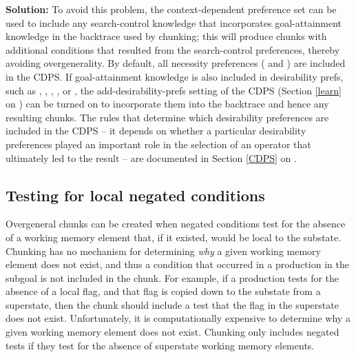 \textbf{Solution:} To avoid this problem, the context-dependent preference set
can be used to include any search-control knowledge that incorporates
goal-attainment knowledge in the backtrace used by chunking;  this will produce
chunks with additional conditions that resulted from the search-control
preferences, thereby avoiding overgenerality.  By default, all necessity
preferences ( and ) are included in the CDPS.  If
goal-attainment knowledge is also included in desirability prefs, such as
, , , , or ,
the add-desirability-prefs setting of the CDPS (Section \ref{learn} on \pageref{learn}) 
can be turned on to incorporate them into the backtrace and hence
any resulting chunks.   The rules that determine which desirability preferences
are included in the CDPS -- it depends on whether a particular desirability
preferences played an important role in the selection of an
operator that ultimately led to the result -- are documented in Section \ref{CDPS} on \pageref{CDPS}.

\subsection{Testing for local negated conditions}

Overgeneral chunks can be created when negated conditions test for the absence
of a working memory element that, if it existed, would be local to the
substate.  Chunking has no mechanism for determining \textit{why} a given
working memory element does not exist, and thus a condition that occurred in a
production in the subgoal is not included in the chunk. For example, if a
production tests for the absence of a local flag, and that flag is copied down
to the substate from a superstate, then the chunk should include a test that
the flag in the superstate does not exist. 
Unfortunately, it is computationally expensive to determine why a given
working memory element does not exist. Chunking only includes negated tests if
they test for the absence of superstate working memory elements. 

